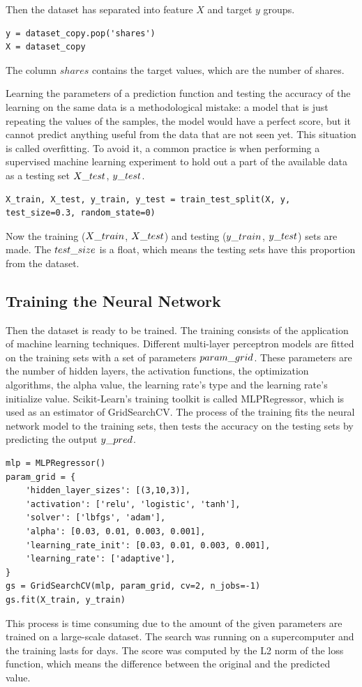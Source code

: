 \noindent Then the dataset has separated into feature $X$ and target $y$ groups.
\begin{lstlisting}
y = dataset_copy.pop('shares')
X = dataset_copy
\end{lstlisting}
The column $shares$ contains the target values, which are the number of shares.\medskip

Learning the parameters of a prediction function and testing the accuracy of the learning on the same data is a methodological mistake: a model that is just repeating the values of the samples, the model would have a perfect score, but it cannot predict anything useful from the data that are not seen yet. This situation is called overfitting. To avoid it, a common practice is when performing a supervised machine learning experiment to hold out a part of the available data as a testing set $X\char`_test$, $y\char`_test$. 
\begin{lstlisting}
X_train, X_test, y_train, y_test = train_test_split(X, y, test_size=0.3, random_state=0)
\end{lstlisting}
Now the training ($X\char`_train$, $X\char`_test$) and testing ($y\char`_train$, $y\char`_test$) sets are made. The $test\char`_size$ is a float, which means the testing sets have this proportion from the dataset.



\subsection{Training the Neural Network}

Then the dataset is ready to be trained. The training consists of the application of machine learning techniques. Different multi-layer perceptron models are fitted on the training sets with a set of parameters $param\char`_grid$. These parameters are the number of hidden layers, the activation functions, the optimization algorithms, the alpha value, the learning rate's type and the learning rate's initialize value. Scikit-Learn's training toolkit is called MLPRegressor, which is used as an estimator of GridSearchCV. The process of the training fits the neural network model to the training sets, then tests the accuracy on the testing sets by predicting the output $y\char`_pred$.  
\begin{lstlisting}
mlp = MLPRegressor()
param_grid = {
	'hidden_layer_sizes': [(3,10,3)],
	'activation': ['relu', 'logistic', 'tanh'],
	'solver': ['lbfgs', 'adam'],
	'alpha': [0.03, 0.01, 0.003, 0.001],
	'learning_rate_init': [0.03, 0.01, 0.003, 0.001],
	'learning_rate': ['adaptive'],
}
gs = GridSearchCV(mlp, param_grid, cv=2, n_jobs=-1)
gs.fit(X_train, y_train)
\end{lstlisting}
This process is time consuming due to the amount of the given parameters are trained on a large-scale dataset. The search was running on a supercomputer and  the training lasts for days. The score was computed by the L2 norm of the loss function, which means the difference between the original and the predicted value. \smallskip

